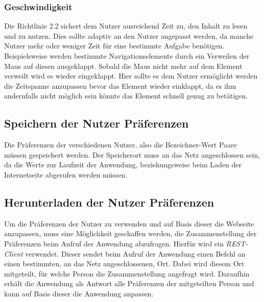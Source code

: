 \documentclass[12pt, paper=a4, bibtotoc, toc=listof, headsepline=true]{scrreprt}
\begin{document}
			\subsubsection{Geschwindigkeit}
			Die Richtlinie 2.2 sichert dem Nutzer ausreichend Zeit zu, den Inhalt zu lesen und zu nutzen. Dies sollte adaptiv an den Nutzer angepasst werden, da manche Nutzer mehr oder weniger Zeit für eine bestimmte Aufgabe benötigen. Beispielsweise werden bestimmte Navigationselemente durch ein Verweilen der Maus auf diesen ausgeklappt. Sobald die Maus nicht mehr auf dem Element verweilt wird es wieder eingeklappt. Hier sollte es dem Nutzer ermöglicht werden die Zeitspanne anzupassen bevor das Element wieder einklappt, da es ihm andernfalls nicht möglich sein könnte das Element schnell genug zu betätigen.		
			
		\subsection{Speichern der Nutzer Präferenzen}
		Die Präferenzen der verschiedenen Nutzer, also die Bezeichner-Wert Paare müssen gespeichert werden. Der Speicherort muss an das Netz angeschlossen sein, da die Werte zur Laufzeit der Anwendung, beziehungsweise beim Laden der Internetseite abgerufen werden müssen.
		
		\subsection{Herunterladen der Nutzer Präferenzen}
		Um die Präferenzen der Nutzer zu verwenden und auf Basis dieser die Webseite anzupassen, muss eine Möglichkeit geschaffen werden, die Zusammenstellung der Präferenzen beim Aufruf der Anwendung abzufragen. Hierfür wird ein \emph{REST-Client} verwendet. Dieser sendet beim Aufruf der Anwendung einen Befehl an einen bestimmten, an das Netz angeschlossenen, Ort. Dabei wird diesem Ort mitgeteilt, für welche Person die Zusammenstellung angefragt wird. Daraufhin erhält die Anwendung als Antwort alle Präferenzen der mitgeteilten Person und kann auf Basis dieser die Anwendung anpassen.
\end{document}
